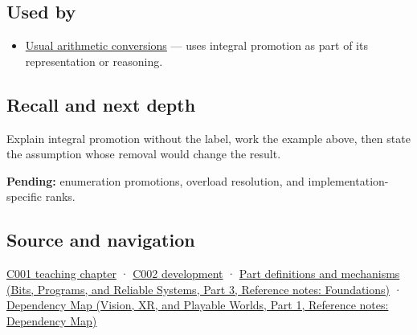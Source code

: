 \subsection{Used by}\label{appendix-45303d03796a-used-by}

\hypertarget{appendix-45303d03796a-used-by}{}

\begin{itemize}
\tightlist
\item
  \hyperref[appendix-5e2d663adf7f]{Usual arithmetic conversions} --- uses integral promotion as part of its representation or reasoning.
\end{itemize}

\subsection{Recall and next depth}\label{appendix-45303d03796a-recall-and-next-depth}

\hypertarget{appendix-45303d03796a-recall-and-next-depth}{}

Explain integral promotion without the label, work the example above, then state the assumption whose removal would change the result.

\textbf{Pending:} enumeration promotions, overload resolution, and implementation-specific ranks.

\subsection{Source and navigation}\label{appendix-45303d03796a-source-and-navigation}

\hypertarget{appendix-45303d03796a-source-and-navigation}{}

\hyperref[01-foundations-i-ch001-from-a-signal-to-an-interpretation]{C001 teaching chapter} · \hyperref[01-foundations-i-ch001-arithmetic-becomes-a-policy]{C002 development} · \href{../01-Bits-Programs-and-Reliable-Systems-P03/main.pdf\#appendix-fd090d982a15}{Part definitions and mechanisms (Bits, Programs, and Reliable Systems, Part 3, Reference notes: Foundations)} · \href{../07-Vision-XR-and-Playable-Worlds-P01/main.pdf\#appendix-4ad47bdd269a}{Dependency Map (Vision, XR, and Playable Worlds, Part 1, Reference notes: Dependency Map)}

